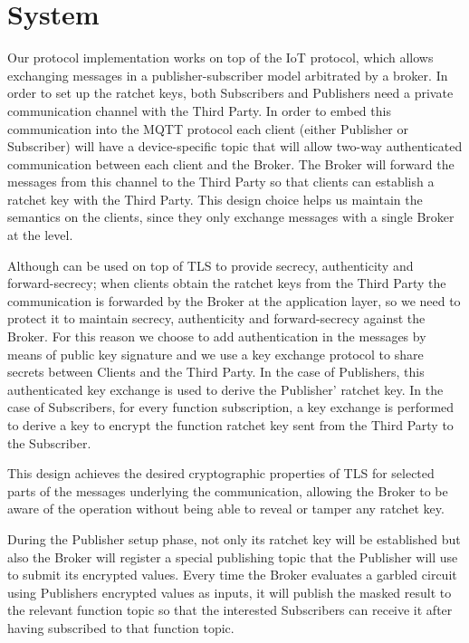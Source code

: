 \section{System}
\label{sec:system}

Our protocol implementation works on top of the IoT \MQTT{} protocol, which
allows exchanging messages in a publisher-subscriber model arbitrated by a
broker.  In order to set up the ratchet keys, both Subscribers and Publishers
need a private communication channel with the Third Party.  In order to embed
this communication into the MQTT protocol each client (either Publisher or
Subscriber) will have a device-specific topic that will allow two-way
authenticated communication between each client and the Broker.  The Broker
will forward the messages from this channel to the Third Party so that clients
can establish a ratchet key with the Third Party.  This design choice helps us
maintain the \MQTT{} semantics on the clients, since they only exchange
messages with a single Broker at the \MQTT{} level.

Although \MQTT{} can be used on top of TLS to provide secrecy, authenticity and
forward-secrecy; when clients obtain the ratchet keys from the Third Party
the communication is forwarded by the Broker at the application layer, so we
need to protect it to maintain secrecy, authenticity and forward-secrecy
against the Broker.  For this reason we choose to add authentication in the
\MQTT{} messages by means of public key signature and we use a key exchange
protocol to share secrets between Clients and the Third Party.  In the case of
Publishers, this authenticated key exchange is used to derive the Publisher'
ratchet key.  In the case of Subscribers, for every function subscription, a
key exchange is performed to derive a key to encrypt the function ratchet key
sent from the Third Party to the Subscriber.

This design achieves the desired cryptographic properties of TLS for selected
parts of the messages underlying the \MQTT{} communication, allowing the Broker
to be aware of the operation without being able to reveal or tamper any ratchet
key.

During the Publisher setup phase, not only its ratchet key will be established
but also the Broker will register a special publishing topic that the Publisher
will use to submit its encrypted values.  Every time the Broker evaluates a
garbled circuit using Publishers encrypted values as inputs, it will publish
the masked result to the relevant function topic so that the interested
Subscribers can receive it after having subscribed to that function topic.

